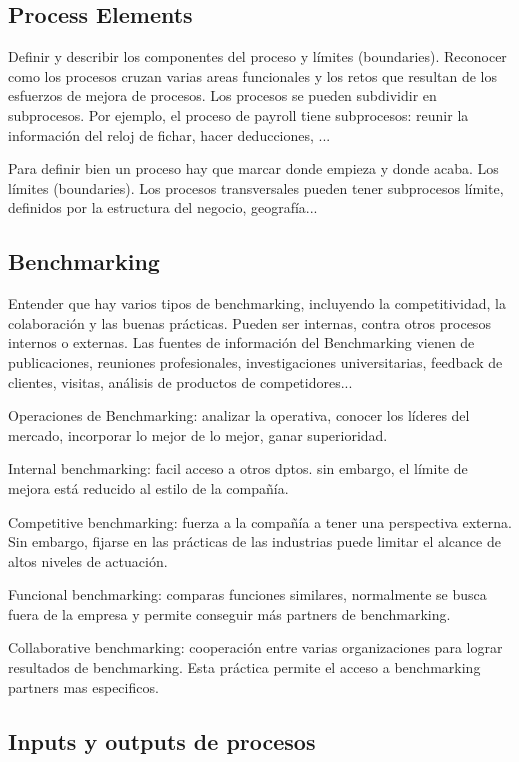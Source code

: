 \documentclass[]{article}
\begin{document}
\subsection{Process Elements}

Definir y describir los componentes del proceso	y límites (boundaries). Reconocer como los procesos cruzan varias areas funcionales y los retos que resultan de los esfuerzos de mejora de procesos. Los procesos se pueden subdividir en subprocesos.
Por ejemplo, el proceso de payroll tiene subprocesos: reunir la información del reloj de fichar, hacer deducciones, ...

Para definir bien un proceso hay que marcar donde empieza y donde acaba. Los límites (boundaries). Los procesos transversales pueden tener subprocesos límite, definidos por la estructura del negocio, geografía...

\subsection{Benchmarking}

Entender que hay varios tipos de benchmarking, incluyendo la competitividad, la colaboración y las buenas prácticas.
Pueden ser internas, contra otros procesos internos o externas. Las fuentes de información del Benchmarking vienen de publicaciones, reuniones profesionales, investigaciones universitarias, feedback de clientes, visitas, análisis de productos de competidores...

Operaciones de Benchmarking: analizar la operativa, conocer los líderes del mercado, incorporar lo mejor de lo mejor, ganar superioridad. 

Internal benchmarking: facil acceso a otros dptos. sin embargo, el límite de mejora está reducido al estilo de la compañía.

Competitive benchmarking: fuerza a la compañía a tener una perspectiva externa. Sin embargo, fijarse en las prácticas de las industrias puede limitar el alcance de altos niveles de actuación.

Funcional benchmarking: comparas funciones similares, normalmente se busca fuera de la empresa y permite conseguir más partners de benchmarking.

Collaborative benchmarking: cooperación entre varias organizaciones para lograr resultados de benchmarking. Esta práctica permite el acceso a benchmarking partners  mas especificos.  

\subsection{Inputs y outputs de procesos}
\end{document}
